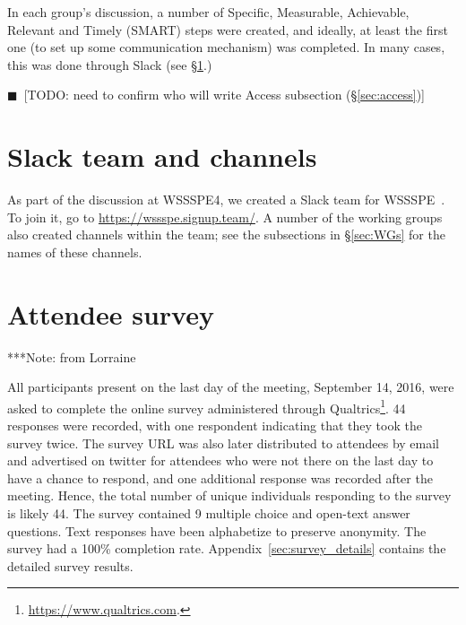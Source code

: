 \documentclass[11pt, oneside]{amsart}
\newcommand{\todo}[1]{{\color{blue}$\blacksquare$~\textsf{[TODO: #1]}}}
\newcommand{\note}[1]{ {\textcolor{blueish}    { ***Note:      #1 }}}
\begin{document}
In each group's discussion, a number of Specific, Measurable, Achievable, Relevant and Timely (SMART) steps were created, and ideally, at least the first one (to set up some communication mechanism) was completed.  In many cases, this was done through Slack (see \S\ref{sec:slack}.)

\todo{need to confirm who will write Access subsection (\S\ref{sec:access})}














\section{Slack team and channels}\label{sec:slack}


As part of the discussion at WSSSPE4, we created a Slack team for WSSSPE~\cite{WSSSPESlack}.  To join it, go to \url{https://wssspe.signup.team/}.  A number of the working groups also created channels within the team; see the subsections in \S\ref{sec:WGs} for the names of these channels.


\section{Attendee survey \label{sec:survey}}

\note{from Lorraine}

All participants present on the last day of the meeting, September 14, 2016, were asked to complete the online survey administered through Qualtrics\footnote{\url{https://www.qualtrics.com}.}.
44 responses were recorded, with one respondent indicating that they took the survey twice.
The survey URL was also later distributed to attendees by email and advertised on twitter for attendees who were not there on the last day to have a chance to respond, and one additional response was recorded after the meeting.
Hence, the total number of unique individuals responding to the survey is likely 44.
The survey contained 9 multiple choice and open-text answer questions.
Text responses have been alphabetize to preserve anonymity.
The survey had a 100\% completion rate.
Appendix~\ref{sec:survey_details} contains the detailed survey results.
\end{document}
